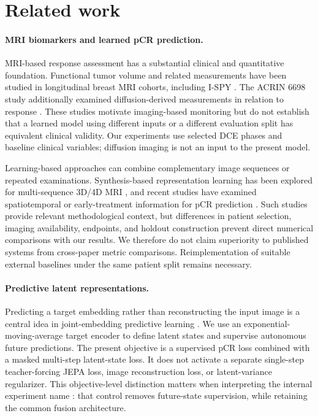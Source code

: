 \section{Related work}
\label{sec:related}
\paragraph{MRI biomarkers and learned pCR prediction.}
MRI-based response assessment has a substantial clinical and quantitative foundation. Functional tumor volume and related measurements have been studied in longitudinal breast MRI cohorts, including I-SPY \citep{hylton2012mri,hylton2016ftv}. The ACRIN 6698 study additionally examined diffusion-derived measurements in relation to response \citep{ACRIN6698diffusion2018}. These studies motivate imaging-based monitoring but do not establish that a learned model using different inputs or a different evaluation split has equivalent clinical validity. Our experiments use selected DCE phases and baseline clinical variables; diffusion imaging is not an input to the present model.

Learning-based approaches can combine complementary image sequences or repeated examinations. Synthesis-based representation learning has been explored for multi-sequence 3D/4D MRI \citep{han2024synthesis}, and recent studies have examined spatiotemporal or early-treatment information for pCR prediction \citep{tang2025spatiotemporal,du2025early}. Such studies provide relevant methodological context, but differences in patient selection, imaging availability, endpoints, and holdout construction prevent direct numerical comparisons with our results. We therefore do not claim superiority to published systems from cross-paper metric comparisons. Reimplementation of suitable external baselines under the same patient split remains necessary.

\paragraph{Predictive latent representations.}
Predicting a target embedding rather than reconstructing the input image is a central idea in joint-embedding predictive learning \citep{jepa2023}. We use an exponential-moving-average target encoder to define latent states and supervise autonomous future predictions. The present objective is a supervised pCR loss combined with a masked multi-step latent-state loss. It does not activate a separate single-step teacher-forcing JEPA loss, image reconstruction loss, or latent-variance regularizer. This objective-level distinction matters when interpreting the internal experiment name \nojepa{}: that control removes future-state supervision, while retaining the common fusion architecture.

